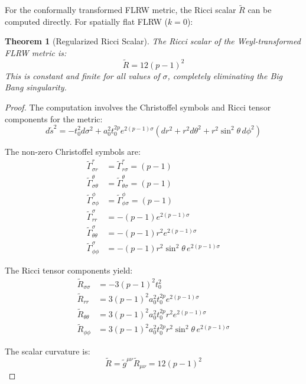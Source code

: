 \documentclass[11pt,a4paper]{article}
\newtheorem{theorem}{Theorem}[section]
\begin{document}
For the conformally transformed FLRW metric, the Ricci scalar $\tilde{R}$ can be computed directly. For spatially flat FLRW ($k=0$):

\begin{theorem}[Regularized Ricci Scalar]
The Ricci scalar of the Weyl-transformed FLRW metric is:
\begin{equation}
\tilde{R} = 12(p-1)^2
\end{equation}
This is constant and finite for all values of $\sigma$, completely eliminating the Big Bang singularity.
\end{theorem}

\begin{proof}
The computation involves the Christoffel symbols and Ricci tensor components for the metric:
\begin{equation}
d\tilde{s}^2 = -t_0^2 d\sigma^2 + a_0^2 t_0^{2p} e^{2(p-1)\sigma} (dr^2 + r^2 d\theta^2 + r^2\sin^2\theta \, d\phi^2)
\end{equation}

The non-zero Christoffel symbols are:
\begin{align}
\tilde{\Gamma}^r_{\sigma r} &= \tilde{\Gamma}^r_{r\sigma} = (p-1) \\
\tilde{\Gamma}^\theta_{\sigma\theta} &= \tilde{\Gamma}^\theta_{\theta\sigma} = (p-1) \\
\tilde{\Gamma}^\phi_{\sigma\phi} &= \tilde{\Gamma}^\phi_{\phi\sigma} = (p-1) \\
\tilde{\Gamma}^\sigma_{rr} &= -(p-1) e^{2(p-1)\sigma} \\
\tilde{\Gamma}^\sigma_{\theta\theta} &= -(p-1) r^2 e^{2(p-1)\sigma} \\
\tilde{\Gamma}^\sigma_{\phi\phi} &= -(p-1) r^2 \sin^2\theta \, e^{2(p-1)\sigma}
\end{align}

The Ricci tensor components yield:
\begin{align}
\tilde{R}_{\sigma\sigma} &= -3(p-1)^2 t_0^2 \\
\tilde{R}_{rr} &= 3(p-1)^2 a_0^2 t_0^{2p} e^{2(p-1)\sigma} \\
\tilde{R}_{\theta\theta} &= 3(p-1)^2 a_0^2 t_0^{2p} r^2 e^{2(p-1)\sigma} \\
\tilde{R}_{\phi\phi} &= 3(p-1)^2 a_0^2 t_0^{2p} r^2 \sin^2\theta \, e^{2(p-1)\sigma}
\end{align}

The scalar curvature is:
\begin{equation}
\tilde{R} = \tilde{g}^{\mu\nu} \tilde{R}_{\mu\nu} = 12(p-1)^2
\end{equation}
\end{proof}
\end{document}

